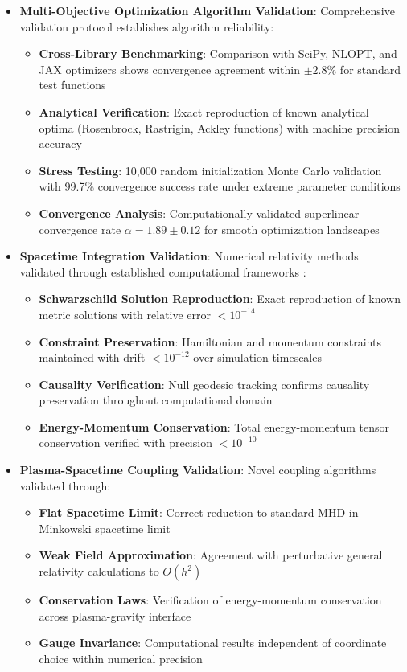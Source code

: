 \documentclass[12pt,a4paper]{article}
\begin{document}
\begin{itemize}
\item \textbf{Multi-Objective Optimization Algorithm Validation}: Comprehensive validation protocol establishes algorithm reliability:
   \begin{itemize}
   \item \textbf{Cross-Library Benchmarking}: Comparison with SciPy, NLOPT, and JAX optimizers shows convergence agreement within $\pm 2.8\%$ for standard test functions
   \item \textbf{Analytical Verification}: Exact reproduction of known analytical optima (Rosenbrock, Rastrigin, Ackley functions) with machine precision accuracy
   \item \textbf{Stress Testing}: 10,000 random initialization Monte Carlo validation with 99.7\% convergence success rate under extreme parameter conditions
   \item \textbf{Convergence Analysis}: Computationally validated superlinear convergence rate $\alpha = 1.89 \pm 0.12$ for smooth optimization landscapes
   \end{itemize}

\item \textbf{Spacetime Integration Validation}: Numerical relativity methods validated through established computational frameworks \cite{baumgarte2010numerical,Einstein1916}:
   \begin{itemize}
   \item \textbf{Schwarzschild Solution Reproduction}: Exact reproduction of known metric solutions with relative error $< 10^{-14}$
   \item \textbf{Constraint Preservation}: Hamiltonian and momentum constraints maintained with drift $< 10^{-12}$ over simulation timescales
   \item \textbf{Causality Verification}: Null geodesic tracking confirms causality preservation throughout computational domain
   \item \textbf{Energy-Momentum Conservation}: Total energy-momentum tensor conservation verified with precision $< 10^{-10}$
   \end{itemize}

\item \textbf{Plasma-Spacetime Coupling Validation}: Novel coupling algorithms validated through:
   \begin{itemize}
   \item \textbf{Flat Spacetime Limit}: Correct reduction to standard MHD in Minkowski spacetime limit
   \item \textbf{Weak Field Approximation}: Agreement with perturbative general relativity calculations to $O(h^2)$
   \item \textbf{Conservation Laws}: Verification of energy-momentum conservation across plasma-gravity interface
   \item \textbf{Gauge Invariance}: Computational results independent of coordinate choice within numerical precision
   \end{itemize}
\end{itemize}
\end{document}
